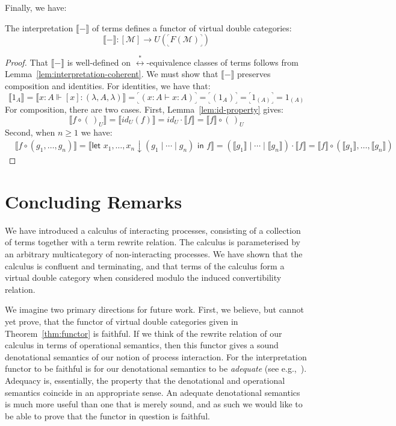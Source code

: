 \documentclass[twoside,11pt,final]{entics}
\newcommand{\corner}[1]{{\text{}^\ulcorner_\llcorner\!{#1}\!_\lrcorner^\urcorner}}
\newcommand{\asn}{\downarrow}
\newcommand{\seq}{,\!\ldots\!,}
\begin{document}
Finally, we have:
\begin{theorem}\label{thm:functor}
  The interpretation $\llbracket - \rrbracket$ of terms defines a functor of virtual double categories:
  \[ \llbracket - \rrbracket : [\mathcal{M}] \to U\left(\corner{F(\mathcal{M})}\right) \]
\end{theorem}
\begin{proof}
  That $\llbracket - \rrbracket$ is well-defined on $\stackrel{*}{\leftrightarrow}$-equivalence classes of terms follows from Lemma~\ref{lem:interpretation-coherent}. We must show that $\llbracket - \rrbracket$ preserves composition and identities. For identities, we have that: \[ \llbracket 1_A \rrbracket = \llbracket x : A \Vdash [x] : (\lambda,A,\lambda) \rrbracket = \corner{(x : A \vdash x : A)} = \corner{(1_A)} = \corner{1_{(A)}} = 1_{(A)} \]
  For composition, there are two cases. First, Lemma~\ref{lem:id-property} gives:
  \[ \llbracket f \circ (\,)_U\rrbracket = \llbracket id_U(f)\rrbracket = id_U \cdot \llbracket f \rrbracket = \llbracket f \rrbracket \circ (\,)_U \]
  Second, when $n \geq 1$ we have:
  \begin{align*}
    & \llbracket f \circ (g_1 \seq g_n) \rrbracket
      = \llbracket \textsf{let } x_1 \seq x_n \asn (g_1 \mid \cdots \mid g_n) \textsf{ in } f \rrbracket
      = (\llbracket g_1 \rrbracket \mid \cdots \mid \llbracket g_n \rrbracket) \cdot \llbracket f \rrbracket
      = \llbracket f \rrbracket \circ (\llbracket g_1 \rrbracket \seq \llbracket g_n \rrbracket)
  \end{align*}
\end{proof}

\section{Concluding Remarks}\label{sec:conclusion}
We have introduced a calculus of interacting processes, consisting of a collection of terms together with a term rewrite relation. The calculus is parameterised by an arbitrary multicategory of non-interacting processes. We have shown that the calculus is confluent and terminating, and that terms of the calculus form a virtual double category when considered modulo the induced convertibility relation.

We imagine two primary directions for future work. First, we believe, but cannot yet prove, that the functor of virtual double categories given in Theorem~\ref{thm:functor} is faithful. If we think of the rewrite relation of our calculus in terms of operational semantics, then this functor gives a sound denotational semantics of our notion of process interaction. For the interpretation functor to be faithful is for our denotational semantics to be \emph{adequate} (see e.g.,~\cite{Cardone2021}). Adequacy is, essentially, the property that the denotational and operational semantics coincide in an appropriate sense. An adequate denotational semantics is much more useful than one that is merely sound, and as such we would like to be able to prove that the functor in question is faithful.
\end{document}
